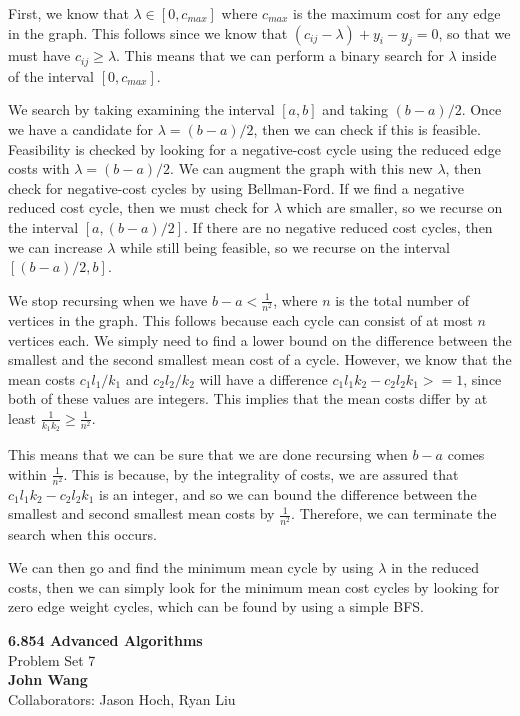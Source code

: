 \documentclass[psamsfonts]{amsart}
\newenvironment{sol}{\vspace{0.25cm}{\large \bfseries Solution:}}{\qedsymbol}
\newcommand{\makenewtitle}{
    \begin{center}
    {\huge \bfseries 6.854 Advanced Algorithms} \\
    Problem Set 7\\
    \vspace{0.25cm}
    {\bfseries John Wang} \\
    Collaborators: Jason Hoch, Ryan Liu 
    \end{center}
    \vspace{0.5cm}
}
\begin{document}
\begin{sol}
First, we know that $\lambda \in [0, c_{max}]$ where $c_{max}$ is the maximum cost for any edge in the graph. This follows since we know that $(c_{ij} - \lambda) + y_i - y_j = 0$, so that we must have $c_{ij} \geq \lambda$. This means that we can perform a binary search for $\lambda$ inside of the interval $[0, c_{max}]$. 

We search by taking examining the interval $[a,b]$ and taking $(b-a)/2$. Once we have a candidate for $\lambda = (b-a)/2$, then we can check if this is feasible. Feasibility is checked by looking for a negative-cost cycle using the reduced edge costs with $\lambda = (b-a)/2$. We can augment the graph with this new $\lambda$, then check for negative-cost cycles by using Bellman-Ford. If we find a negative reduced cost cycle, then we must check for $\lambda$ which are smaller, so we recurse on the interval $[a, (b-a)/2]$. If there are no negative reduced cost cycles, then we can increase $\lambda$ while still being feasible, so we recurse on the interval $[(b-a)/2, b]$. 

We stop recursing when we have $b - a < \frac{1}{n^2}$, where $n$ is the total number of vertices in the graph. This follows because each cycle can consist of at most $n$ vertices each. We simply need to find a lower bound on the difference between the smallest and the second smallest mean cost of a cycle. However, we know that the mean costs $c_1 l_1 / k_1$ and $c_2 l_2 / k_2$ will have a difference $c_1 l_1 k_2 - c_2 l_2 k_1 >= 1$, since both of these values are integers. This implies that the mean costs differ by at least $\frac{1}{k_1 k_2} \geq \frac{1}{n^2}$. 

This means that we can be sure that we are done recursing when $b-a$ comes within $\frac{1}{n^2}$. This is because, by the integrality of costs, we are assured that $c_1 l_1 k_2 - c_2 l_2 k_1$ is an integer, and so we can bound the difference between the smallest and second smallest mean costs by $\frac{1}{n^2}$. Therefore, we can terminate the search when this occurs. 

We can then go and find the minimum mean cycle by using $\lambda$ in the reduced costs, then we can simply look for the minimum mean cost cycles by looking for zero edge weight cycles, which can be found by using a simple BFS.
\end{sol}

\newpage
\makenewtitle
\end{document}
